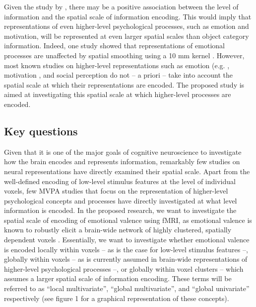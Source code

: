 \documentclass[12pt,a4paper]{article}\usepackage[]{graphicx}\usepackage[]{color}
\begin{document}
Given the study by \cite{brants2011}, there may be a positive association between the level of information and the spatial scale of information encoding. This would imply that representations of even higher-level psychological processes, such as emotion and motivation, will be represented at even larger spatial scales than object category information. Indeed, one study showed that representations of emotional processes are unaffected by spatial smoothing using a 10 mm kernel \citep{oosterwijk2015}. However, most known studies on higher-level representations such as emotion (e.g. \citealp{kassam2013,baucom2012}, motivation \cite{etzel2015}, and social perception \citep{corradi2014,chavez2015} do not -- a priori -- take into account the spatial scale at which their representations are encoded. The proposed study is aimed at investigating this spatial scale at which higher-level processes are encoded.       

\subsection{Key questions}

Given that it is one of the major goals of cognitive neuroscience to investigate how the brain encodes and represents information, remarkably few studies on neural representations have directly examined their spatial scale. Apart from the well-defined encoding of low-level stimulus features at the level of individual voxels, few MVPA studies that focus on the representation of higher-level psychological concepts and processes have directly investigated at what level information is encoded. In the proposed research, we want to investigate the spatial scale of encoding of emotional valence using fMRI, as emotional valence is known to robustly elicit a brain-wide network of highly clustered, spatially dependent voxels \citep{lindquist2015,chavez2015,kassam2013}. Essentially, we want to investigate whether emotional valence is encoded locally within voxels -- as is the case for low-level stimulus features --, globally within voxels -- as is currently assumed in brain-wide representations of higher-level psychological processes --, or globally within voxel clusters -- which assumes a larger spatial scale of information encoding. These terms will be referred to as ``local multivariate'', ``global multivariate'', and ``global univariate'' respectively (see figure 1 for a graphical representation of these concepts).       
\end{document}
